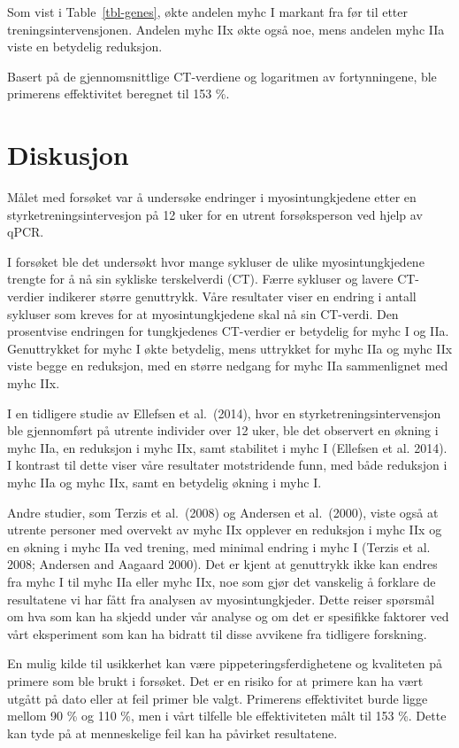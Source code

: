 \documentclass[
  letterpaper,
  DIV=11,
  numbers=noendperiod]{scrreprt}
\begin{document}
Som vist i Table~\ref{tbl-genes}, økte andelen myhc I markant fra før
til etter treningsintervensjonen. Andelen myhc IIx økte også noe, mens
andelen myhc IIa viste en betydelig reduksjon.

Basert på de gjennomsnittlige CT-verdiene og logaritmen av
fortynningene, ble primerens effektivitet beregnet til 153 \%.

\section{Diskusjon}\label{diskusjon-5}

Målet med forsøket var å undersøke endringer i myosintungkjedene etter
en styrketreningsintervesjon på 12 uker for en utrent forsøksperson ved
hjelp av qPCR.

I forsøket ble det undersøkt hvor mange sykluser de ulike
myosintungkjedene trengte for å nå sin sykliske terskelverdi (CT). Færre
sykluser og lavere CT-verdier indikerer større genuttrykk. Våre
resultater viser en endring i antall sykluser som kreves for at
myosintungkjedene skal nå sin CT-verdi. Den prosentvise endringen for
tungkjedenes CT-verdier er betydelig for myhc I og IIa. Genuttrykket for
myhc I økte betydelig, mens uttrykket for myhc IIa og myhc IIx viste
begge en reduksjon, med en større nedgang for myhc IIa sammenlignet med
myhc IIx.

I en tidligere studie av Ellefsen et al.~(2014), hvor en
styrketreningsintervensjon ble gjennomført på utrente individer over 12
uker, ble det observert en økning i myhc IIa, en reduksjon i myhc IIx,
samt stabilitet i myhc I (Ellefsen et al. 2014). I kontrast til dette
viser våre resultater motstridende funn, med både reduksjon i myhc IIa
og myhc IIx, samt en betydelig økning i myhc I.

Andre studier, som Terzis et al.~(2008) og Andersen et al.~(2000), viste
også at utrente personer med overvekt av myhc IIx opplever en reduksjon
i myhc IIx og en økning i myhc IIa ved trening, med minimal endring i
myhc I (Terzis et al. 2008; Andersen and Aagaard 2000). Det er kjent at
genuttrykk ikke kan endres fra myhc I til myhc IIa eller myhc IIx, noe
som gjør det vanskelig å forklare de resultatene vi har fått fra
analysen av myosintungkjeder. Dette reiser spørsmål om hva som kan ha
skjedd under vår analyse og om det er spesifikke faktorer ved vårt
eksperiment som kan ha bidratt til disse avvikene fra tidligere
forskning.

En mulig kilde til usikkerhet kan være pippeteringsferdighetene og
kvaliteten på primere som ble brukt i forsøket. Det er en risiko for at
primere kan ha vært utgått på dato eller at feil primer ble valgt.
Primerens effektivitet burde ligge mellom 90 \% og 110 \%, men i vårt
tilfelle ble effektiviteten målt til 153 \%. Dette kan tyde på at
menneskelige feil kan ha påvirket resultatene.
\end{document}
